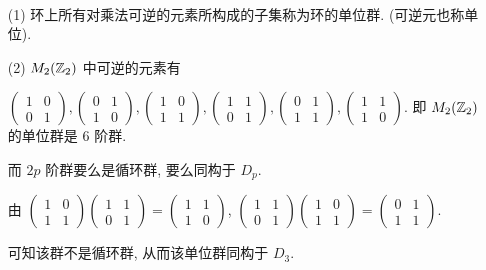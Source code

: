 \begin{solution}\
	\begin{itemize}
		\item[(1)] 环上所有对乘法可逆的元素所构成的子集称为环的单位群. (可逆元也称单位).

		\item[(2)] $M_2(\mathbb Z_2)$ 中可逆的元素有

		$\left(\begin{array}{cc}1 & 0\\0 & 1\end{array}\right),
		\left(\begin{array}{cc}0 & 1\\1 & 0\end{array}\right),
		\left(\begin{array}{cc}1 & 0\\1 & 1\end{array}\right),
		\left(\begin{array}{cc}1 & 1\\0 & 1\end{array}\right),
		\left(\begin{array}{cc}0 & 1\\1 & 1\end{array}\right),
		\left(\begin{array}{cc}1 & 1\\1 & 0\end{array}\right).
		$
		即 $M_2(\mathbb Z_2)$ 的单位群是 $6$ 阶群.

		而 $2p$ 阶群要么是循环群, 要么同构于 $D_p$.

		由
		$\left(\begin{array}{cc}1 & 0\\1 & 1\end{array}\right)\left(\begin{array}{cc}1 & 1\\0 & 1\end{array}\right)=
		\left(\begin{array}{cc}1 & 1\\1 & 0\end{array}\right)$,
		$\left(\begin{array}{cc}1 & 1\\0 & 1\end{array}\right)\left(\begin{array}{cc}1 & 0\\1 & 1\end{array}\right)=
		\left(\begin{array}{cc}0 & 1\\1 & 1\end{array}\right)$.

		可知该群不是循环群, 从而该单位群同构于 $D_3$.
	\end{itemize}
\end{solution}


